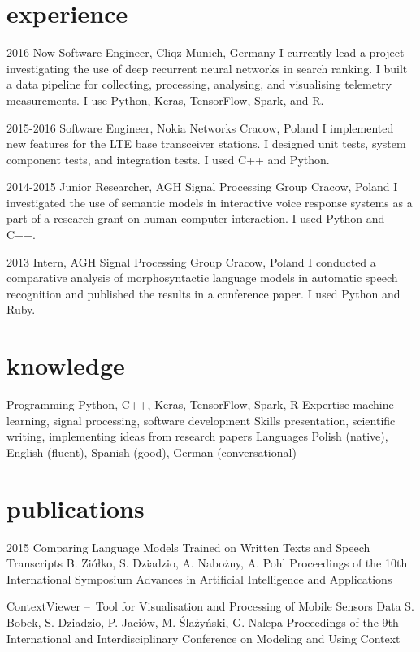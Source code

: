 \documentclass[]{friggeri-cv_osx}
\begin{document}
\section{experience}
\begin{entrylist}
\entry
{2016-Now}
{Software Engineer, Cliqz}
{Munich, Germany}
{I currently lead a project investigating the use of deep recurrent neural networks in search ranking. I built a data pipeline for collecting, processing, analysing, and visualising telemetry measurements. I use Python, Keras, TensorFlow, Spark, and R.\\}

\entry
{2015-2016}
{Software Engineer, Nokia Networks}
{Cracow, Poland}
{I implemented new features for the LTE base transceiver stations. I designed unit tests, system component tests, and integration tests. I used C++ and Python.\\}

\entry
{2014-2015}
{Junior Researcher, AGH Signal Processing Group}
{Cracow, Poland}
{I investigated the use of semantic models in interactive voice response systems as a part of a research grant on human-computer interaction. I used Python and C++.\\}

\entry
{2013}
{Intern, AGH Signal Processing Group}
{Cracow, Poland}
{I conducted a comparative analysis of morphosyntactic language models in automatic speech recognition and published the results in a conference paper. I used Python and Ruby.\\}
\end{entrylist}


\section{knowledge}
\begin{entrylist}
\entry
{}
{Programming}
{}
{Python, C++, Keras, TensorFlow, Spark, R}
\entry
{}
{Expertise}
{}
{machine learning, signal processing, software development}
\entry
{}
{Skills}
{}
{presentation, scientific writing, implementing ideas from research papers}
\entry
{}
{Languages}
{}
{Polish (native), English (fluent), Spanish (good), German (conversational)}
\end{entrylist}


\section{publications}
\begin{entrylist}
\entry
{2015}
{Comparing Language Models Trained on Written Texts and Speech Transcripts}
{B. Ziółko, S. Dziadzio, A. Nabożny, A. Pohl}
{Proceedings of the 10th International Symposium Advances in Artificial Intelligence and Applications\\}

\entry
{}
{ContextViewer – Tool for Visualisation and Processing of Mobile Sensors Data}
{S. Bobek, S. Dziadzio, P. Jaciów, M. Ślażyński, G. Nalepa}
{Proceedings of the 9th International and Interdisciplinary Conference on Modeling and Using Context\\}
\end{entrylist}
\end{document}
